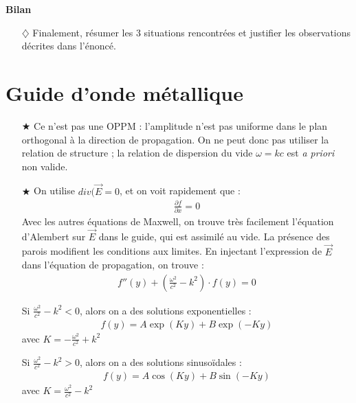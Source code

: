\documentclass{report}
\begin{document}
\textbf{Bilan}

\begin{itemize}

	\item[$\diamondsuit$] Finalement, résumer les 3 situations rencontrées et justifier les observations décrites dans l'énoncé.


\end{itemize}

\section*{Guide d'onde métallique}

\begin{itemize}

	\item[$\bigstar$] Ce n'est pas une OPPM : l'amplitude n'est pas uniforme dans le plan orthogonal à la direction de propagation. On ne peut donc pas utiliser la relation de structure ; la relation de dispersion du vide $\omega=kc$ est \textit{a priori} non valide.
	
	\item[$\bigstar$] On utilise $div(\vec{E}=0$, et on voit rapidement que :
	\begin{align*}
		\frac{\partial f}{\partial x} =0 
	\end{align*}
	Avec les autres équations de Maxwell, on trouve très facilement l'équation d'Alembert sur $\vec{E}$ dans le guide, qui est assimilé au vide. La présence des parois modifient les conditions aux limites. En injectant l'expression de $\vec{E}$ dans l'équation de propagation, on trouve :
	\begin{align*}
		f''(y)+\left(\frac{\omega^2}{c^2} - k^2 \right)\cdot f(y) =0
	\end{align*}
	
	Si $\frac{\omega^2}{c^2} - k^2<0$, alors on a des solutions exponentielles :
	\begin{align*}
		f(y)=A\exp(Ky)+B\exp(-Ky)
	\end{align*}
	avec $K=-\frac{\omega^2}{c^2} + k^2$
	
	Si $\frac{\omega^2}{c^2} - k^2>0$, alors on a des solutions sinusoïdales :
	\begin{align*}
		f(y)=A\cos(Ky)+B\sin(-Ky)
	\end{align*}
	avec $K=\frac{\omega^2}{c^2} - k^2$
	

\end{itemize}
\end{document}
